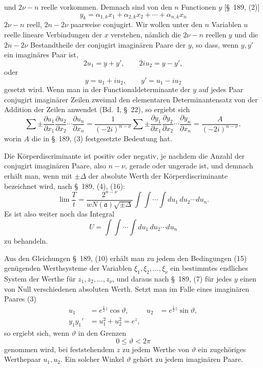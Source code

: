 \documentclass[11pt]{article}
\begin{document}
und $2\nu-n$ reelle vorkommen. Demnach sind von den $n$ Functionen $y$ [\S~189, (2)]
\begin{equation}
y_k=\alpha_{1,k}x_1+\alpha_{2,k}x_2+\cdots+\alpha_{n,k}x_n
\tag{2}
\end{equation}
$2\nu-n$ reell, $2n-2\nu$ paarweise conjugirt. Wir wollen unter den $n$ Variablen $u$ reelle lineare Verbindungen der $x$ verstehen, nämlich die $2\nu-n$ reellen $y$ und die $2n-2\nu$ Bestandtheile der conjugirt imaginären Paare der $y$, so dass, wenn $y,y'$ ein imaginäres Paar ist,
\[
2u_1=y+y',\qquad 2iu_2=y-y',
\]
oder
\begin{equation}
y=u_1+iu_2,
\qquad y'=u_1-iu_2
\tag{3}
\end{equation}
gesetzt wird. Wenn man in der Functionaldeterminante der $y$ auf jedes Paar conjugirt imaginärer Zeilen zweimal den elementaren Determinantensatz von der Addition der Zeilen anwendet (Bd.~I, \S~22), so ergiebt sich
\[
\sum\pm
\frac{\partial u_1}{\partial x_1}
\frac{\partial u_2}{\partial x_2}\cdots
\frac{\partial u_n}{\partial x_n}
=
\frac1{(-2i)^{n-\nu}}
\sum\pm
\frac{\partial y_1}{\partial x_1}
\frac{\partial y_2}{\partial x_2}\cdots
\frac{\partial y_n}{\partial x_n}
=
\frac{A}{(-2i)^{n-\nu}},
\]
worin $A$ die in \S~189, (3) festgesetzte Bedeutung hat.

Die Körperdiscriminante ist positiv oder negativ, je nachdem die Anzahl der conjugirt imaginären Paare, also $n-\nu$, gerade oder ungerade ist, und demnach erhält man, wenn mit $\pm\Delta$ der absolute Werth der Körperdiscriminante bezeichnet wird, nach \S~189, (4), (16):
\begin{equation}
\lim\frac{T}{t}
=
\frac{2^{n-\nu}}{wN(\mathfrak a)\sqrt{\pm\Delta}}
\int\!\int\cdots\int du_1\,du_2\cdots du_n.
\tag{4}
\end{equation}
Es ist also weiter noch das Integral
\[
U=\int\!\int\cdots\int du_1\,du_2\cdots du_n
\]
zu behandeln.

Aus den Gleichungen \S~189, (10) erhält man zu jedem den Bedingungen (15) genügenden Werthsysteme der Variablen $\xi_1,\xi_2,\ldots,\xi_\nu$ ein bestimmtes endliches System der Werthe für $z_1,z_2,\ldots,z_\nu$, und daraus nach \S~189, (7) für jedes $y$ einen von Null verschiedenen absoluten Werth. Setzt man im Falle eines imaginären Paares (3)
\begin{align}
u_1&=e^{\frac12 z}\cos\vartheta,
&u_2&=e^{\frac12 z}\sin\vartheta,
\tag{5}\\
y_1y_1'&=u_1^2+u_2^2=e^z,
\tag{6}
\end{align}
so ergiebt sich, wenn $\vartheta$ in den Grenzen
\[
0\leq\vartheta<2\pi
\]
genommen wird, bei feststehendem $z$ zu jedem Werthe von $\vartheta$ ein zugehöriges Werthepaar $u_1,u_2$. Ein solcher Winkel $\vartheta$ gehört zu jedem imaginären Paare.
\end{document}
